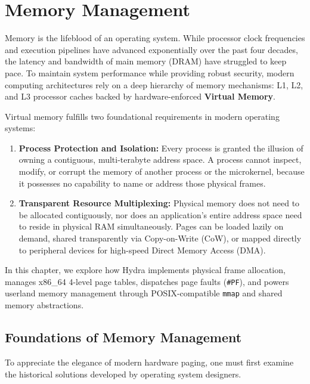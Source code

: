 \chapter{Memory Management}
\label{chap:memory}

Memory is the lifeblood of an operating system. While processor clock frequencies and execution pipelines have advanced exponentially over the past four decades, the latency and bandwidth of main memory (DRAM) have struggled to keep pace. To maintain system performance while providing robust security, modern computing architectures rely on a deep hierarchy of memory mechanisms: L1, L2, and L3 processor caches backed by hardware-enforced \textbf{Virtual Memory}.

Virtual memory fulfills two foundational requirements in modern operating systems:
\begin{enumerate}
    \item \textbf{Process Protection and Isolation:} Every process is granted the illusion of owning a contiguous, multi-terabyte address space. A process cannot inspect, modify, or corrupt the memory of another process or the microkernel, because it possesses no capability to name or address those physical frames.
    \item \textbf{Transparent Resource Multiplexing:} Physical memory does not need to be allocated contiguously, nor does an application's entire address space need to reside in physical RAM simultaneously. Pages can be loaded lazily on demand, shared transparently via Copy-on-Write (CoW), or mapped directly to peripheral devices for high-speed Direct Memory Access (DMA).
\end{enumerate}

In this chapter, we explore how Hydra implements physical frame allocation, manages x86\_64 4-level page tables, dispatches page faults (\texttt{\#PF}), and powers userland memory management through POSIX-compatible \texttt{mmap} and shared memory abstractions.

\section{Foundations of Memory Management}
\label{sec:mem_foundations}

To appreciate the elegance of modern hardware paging, one must first examine the historical solutions developed by operating system designers.


